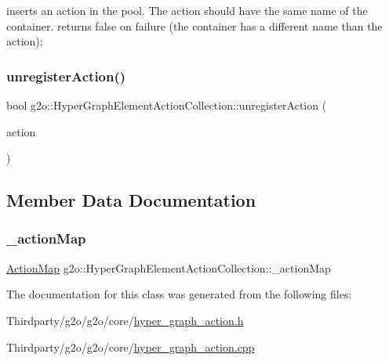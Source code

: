 inserts an action in the pool. The action should have the same name of the container. returns false on failure (the container has a different name than the action); \mbox{\label{classg2o_1_1_hyper_graph_element_action_collection_a6dc646c0dd8fbf9b54fb8161348af5e6}} 
\subsubsection{\texorpdfstring{unregister\+Action()}{unregisterAction()}}
{\footnotesize\ttfamily bool g2o\+::\+Hyper\+Graph\+Element\+Action\+Collection\+::unregister\+Action (\begin{DoxyParamCaption}\item[{\mbox{\hyperlink{classg2o_1_1_hyper_graph_element_action}{Hyper\+Graph\+Element\+Action}} $\ast$}]{action }\end{DoxyParamCaption})}



\subsection{Member Data Documentation}
\mbox{\label{classg2o_1_1_hyper_graph_element_action_collection_a637c13fca95eacab38ee82eedd3669e4}} 
\subsubsection{\texorpdfstring{\+\_\+action\+Map}{\_actionMap}}
{\footnotesize\ttfamily \mbox{\hyperlink{classg2o_1_1_hyper_graph_element_action_abc889fc90ae1bbb63d90c7993777417a}{Action\+Map}} g2o\+::\+Hyper\+Graph\+Element\+Action\+Collection\+::\+\_\+action\+Map\hspace{0.3cm}{\ttfamily [protected]}}



The documentation for this class was generated from the following files\+:\begin{DoxyCompactItemize}
\item 
Thirdparty/g2o/g2o/core/\mbox{\hyperlink{hyper__graph__action_8h}{hyper\+\_\+graph\+\_\+action.\+h}}\item 
Thirdparty/g2o/g2o/core/\mbox{\hyperlink{hyper__graph__action_8cpp}{hyper\+\_\+graph\+\_\+action.\+cpp}}\end{DoxyCompactItemize}
